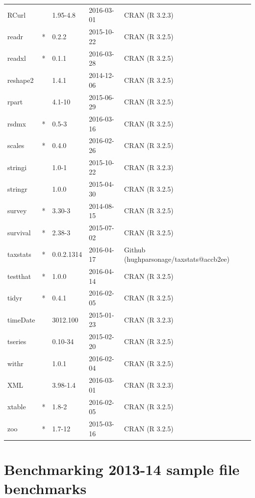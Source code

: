 \documentclass{grattan}\usepackage[]{graphicx}\usepackage[]{color}
\begin{document}
\begin{longtable}{lllll}
  RCurl &  & 1.95-4.8 & 2016-03-01 & CRAN (R 3.2.3) \\ 
  readr & * & 0.2.2 & 2015-10-22 & CRAN (R 3.2.5) \\ 
  readxl & * & 0.1.1 & 2016-03-28 & CRAN (R 3.2.5) \\ 
  reshape2 &  & 1.4.1 & 2014-12-06 & CRAN (R 3.2.5) \\ 
  rpart &  & 4.1-10 & 2015-06-29 & CRAN (R 3.2.5) \\ 
  rsdmx & * & 0.5-3 & 2016-03-16 & CRAN (R 3.2.5) \\ 
  scales & * & 0.4.0 & 2016-02-26 & CRAN (R 3.2.5) \\ 
  stringi &  & 1.0-1 & 2015-10-22 & CRAN (R 3.2.3) \\ 
  stringr &  & 1.0.0 & 2015-04-30 & CRAN (R 3.2.5) \\ 
  survey & * & 3.30-3 & 2014-08-15 & CRAN (R 3.2.5) \\ 
  survival & * & 2.38-3 & 2015-07-02 & CRAN (R 3.2.5) \\ 
  taxstats & * & 0.0.2.1314 & 2016-04-17 & Github (hughparsonage/taxstats@accb2ee) \\ 
  testthat & * & 1.0.0 & 2016-04-14 & CRAN (R 3.2.5) \\ 
  tidyr & * & 0.4.1 & 2016-02-05 & CRAN (R 3.2.5) \\ 
  timeDate &  & 3012.100 & 2015-01-23 & CRAN (R 3.2.3) \\ 
  tseries &  & 0.10-34 & 2015-02-20 & CRAN (R 3.2.5) \\ 
  withr &  & 1.0.1 & 2016-02-04 & CRAN (R 3.2.5) \\ 
  XML &  & 3.98-1.4 & 2016-03-01 & CRAN (R 3.2.3) \\ 
  xtable & * & 1.8-2 & 2016-02-05 & CRAN (R 3.2.5) \\ 
  zoo & * & 1.7-12 & 2015-03-16 & CRAN (R 3.2.5) \\ 
   \bottomrule
\end{longtable}




\twocolumn
\chapter{Benchmarking 2013-14 sample file benchmarks}
\end{document}
